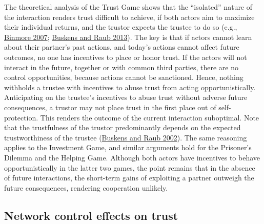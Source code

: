 \documentclass[
  11pt,
]{article}
\begin{document}
The theoretical analysis of the Trust Game shows that the ``isolated'' nature of the interaction renders trust difficult to achieve, if both actors aim to maximize their individual returns, and the trustor expects the trustee to do so (e.g., \protect\hyperlink{ref-binmore_playing_2007}{Binmore 2007}; \protect\hyperlink{ref-buskens_raub_handbook_2013}{Buskens and Raub 2013}).
The key is that if actors cannot learn about their partner's past actions, and today's actions cannot affect future outcomes, no one has incentives to place or honor trust.
If the actors will not interact in the future, together or with common third parties, there are no control opportunities, because actions cannot be sanctioned.
Hence, nothing withholds a trustee with incentives to abuse trust from acting opportunistically.
Anticipating on the trustee's incentives to abuse trust without adverse future consequences, a trustor may not place trust in the first place out of self-protection.
This renders the outcome of the current interaction suboptimal.
Note that the trustfulness of the trustor predominantly depends on the expected trustworthiness of the trustee (\protect\hyperlink{ref-buskens_raub_embedded_2002}{Buskens and Raub 2002}).
The same reasoning applies to the Investment Game, and similar arguments hold for the Prisoner's Dilemma and the Helping Game.
Although both actors have incentives to behave opportunistically in the latter two games, the point remains that in the absence of future interactions, the short-term gains of exploiting a partner outweigh the future consequences, rendering cooperation unlikely.

\hypertarget{network-control-effects-on-trust}{%
\subsection{Network control effects on trust}\label{network-control-effects-on-trust}}
\end{document}
